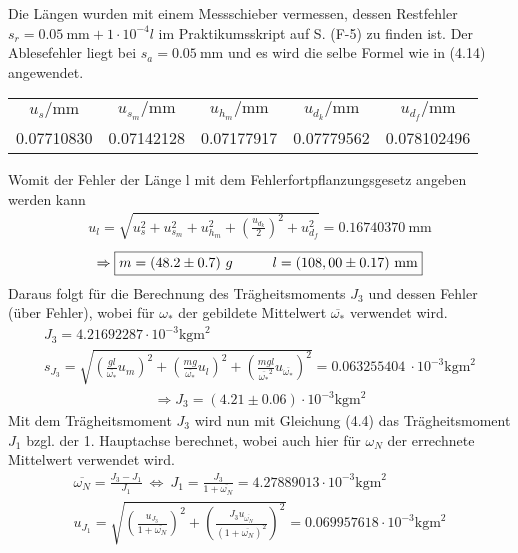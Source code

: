 Die Längen wurden mit einem Messschieber vermessen, dessen Restfehler \\ $s_r=0.05~\text{mm}+1\cdot10^{-4}l$ im Praktikumsskript auf S. (F-5) zu finden ist. Der Ablesefehler liegt bei $s_a=0.05~\text{mm}$ und es wird die selbe Formel wie in (4.14) angewendet.
\begin{center}
    \begin{tabular}{ccccc}
        \rowcolor[rgb]{ .741,  .843,  .933}  $u_{s}/\text{mm} $ &  $u_{s_m}/\text{mm}$ &  $u_{h_m}/\text{mm}$ &  $u_{d_k}/\text{mm}$ &  $u_{d_f}/\text{mm}$\\
        0.07710830 & 0.07142128 & 0.07177917 & 0.07779562 & 0.078102496
    \end{tabular}
\end{center}
Womit der Fehler der Länge l mit dem Fehlerfortpflanzungsgesetz angeben werden kann
\begin{align}
    u_l=\sqrt{u_s^2+u_{s_m}^2+u_{h_m}^2+\left(\frac{u_{d_k}}{2}\right)^2+u_{d_f}^2}=0.16740370~\text{mm}
\end{align}
\begin{align*}
    \Rightarrow\boxed{m=(48.2\pm0.7)~g\tab l=(108,00\pm0.17)~\text{mm}}
\end{align*}
Daraus folgt für die Berechnung des Trägheitsmoments $J_3$ und dessen Fehler (über Fehler), wobei für $\omega_*$ der gebildete Mittelwert $\overline{\omega_*}$ verwendet wird. 
\begin{gather}
    J_3 = 4.21692287\cdot10^{-3}\text{kgm}^2 \\
    s_{J_3}=\sqrt{\left(\frac{gl}{\overline{\omega_*}}u_m\right)^2+\left(\frac{mg}{\overline{\omega_*}}u_l\right)^2+\left(\frac{mgl}{\overline{\omega_*}^2}u_{\overline{\omega_*}}\right)^2}=0.063255404~\cdot10^{-3}\text{kgm}^2
\end{gather}
\begin{align*}
    \Rightarrow\boxed{J_3=(4.21\pm0.06)\cdot10^{-3}\text{kgm}^2}
\end{align*}
Mit dem Trägheitsmoment $J_3$ wird nun mit Gleichung (4.4) das Trägheitsmoment $J_1$ bzgl. der 1. Hauptachse berechnet, wobei auch hier für $\omega_N$ der errechnete Mittelwert verwendet wird.
\begin{gather}
    \overline{\omega_N}=\frac{J_3-J_1}{J_1}~\Leftrightarrow~ J_1=\frac{J_3}{1+\overline{\omega_N}}=4.27889013\cdot 10^{-3}\text{kgm}^2\\
    u_{J_1}=\sqrt{\left(\frac{u_{J_3}}{1+\overline{\omega_N}}\right)^2+\left(\frac{J_3u_{\overline{\omega_N}}}{(1+\overline{\omega_N})^2}\right)^2}=0.069957618\cdot 10^{-3}\text{kgm}^2
\end{gather}
